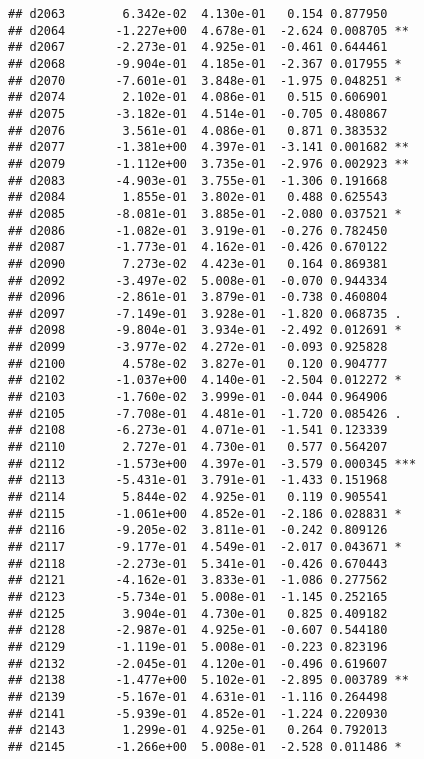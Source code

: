 \documentclass[
]{article}
\begin{document}
\begin{verbatim}
## d2063        6.342e-02  4.130e-01   0.154 0.877950    
## d2064       -1.227e+00  4.678e-01  -2.624 0.008705 ** 
## d2067       -2.273e-01  4.925e-01  -0.461 0.644461    
## d2068       -9.904e-01  4.185e-01  -2.367 0.017955 *  
## d2070       -7.601e-01  3.848e-01  -1.975 0.048251 *  
## d2074        2.102e-01  4.086e-01   0.515 0.606901    
## d2075       -3.182e-01  4.514e-01  -0.705 0.480867    
## d2076        3.561e-01  4.086e-01   0.871 0.383532    
## d2077       -1.381e+00  4.397e-01  -3.141 0.001682 ** 
## d2079       -1.112e+00  3.735e-01  -2.976 0.002923 ** 
## d2083       -4.903e-01  3.755e-01  -1.306 0.191668    
## d2084        1.855e-01  3.802e-01   0.488 0.625543    
## d2085       -8.081e-01  3.885e-01  -2.080 0.037521 *  
## d2086       -1.082e-01  3.919e-01  -0.276 0.782450    
## d2087       -1.773e-01  4.162e-01  -0.426 0.670122    
## d2090        7.273e-02  4.423e-01   0.164 0.869381    
## d2092       -3.497e-02  5.008e-01  -0.070 0.944334    
## d2096       -2.861e-01  3.879e-01  -0.738 0.460804    
## d2097       -7.149e-01  3.928e-01  -1.820 0.068735 .  
## d2098       -9.804e-01  3.934e-01  -2.492 0.012691 *  
## d2099       -3.977e-02  4.272e-01  -0.093 0.925828    
## d2100        4.578e-02  3.827e-01   0.120 0.904777    
## d2102       -1.037e+00  4.140e-01  -2.504 0.012272 *  
## d2103       -1.760e-02  3.999e-01  -0.044 0.964906    
## d2105       -7.708e-01  4.481e-01  -1.720 0.085426 .  
## d2108       -6.273e-01  4.071e-01  -1.541 0.123339    
## d2110        2.727e-01  4.730e-01   0.577 0.564207    
## d2112       -1.573e+00  4.397e-01  -3.579 0.000345 ***
## d2113       -5.431e-01  3.791e-01  -1.433 0.151968    
## d2114        5.844e-02  4.925e-01   0.119 0.905541    
## d2115       -1.061e+00  4.852e-01  -2.186 0.028831 *  
## d2116       -9.205e-02  3.811e-01  -0.242 0.809126    
## d2117       -9.177e-01  4.549e-01  -2.017 0.043671 *  
## d2118       -2.273e-01  5.341e-01  -0.426 0.670443    
## d2121       -4.162e-01  3.833e-01  -1.086 0.277562    
## d2123       -5.734e-01  5.008e-01  -1.145 0.252165    
## d2125        3.904e-01  4.730e-01   0.825 0.409182    
## d2128       -2.987e-01  4.925e-01  -0.607 0.544180    
## d2129       -1.119e-01  5.008e-01  -0.223 0.823196    
## d2132       -2.045e-01  4.120e-01  -0.496 0.619607    
## d2138       -1.477e+00  5.102e-01  -2.895 0.003789 ** 
## d2139       -5.167e-01  4.631e-01  -1.116 0.264498    
## d2141       -5.939e-01  4.852e-01  -1.224 0.220930    
## d2143        1.299e-01  4.925e-01   0.264 0.792013    
## d2145       -1.266e+00  5.008e-01  -2.528 0.011486 *  

\end{verbatim}
\end{document}
